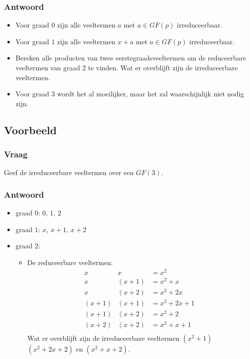 \documentclass[main.tex]{subfiles}
\begin{document}
\subsubsection*{Antwoord}
\begin{itemize}
\item Voor graad $0$ zijn alle veeltermen $a$ met $a\in GF(p)$ irreduceerbaar.
\item Voor graad $1$ zijn alle veeltermen $x+a$ met $a\in GF(p)$ irreduceerbaar.
\item Bereken alle producten van twee eerstegraadsveeltermen om de reduceerbare veeltermen van graad $2$ te vinden.
  Wat er overblijft zijn de irreduceerbare veeltermen.
\item Voor graad $3$ wordt het al moeilijker, maar het zal waarschijnlijk niet nodig zijn.
\end{itemize}

\subsection*{Voorbeeld}
\subsubsection*{Vraag}
Geef de irreduceerbare veeltermen over een $GF(3)$.
\subsubsection*{Antwoord}
\begin{itemize}
\item graad $0$: $0$, $1$, $2$
\item graad $1$: $x$, $x+1$, $x+2$
\item graad $2$:
  \begin{itemize}
  \item De reduceerbare veeltermen:
    \[
    \begin{array}{ccl}
      x & x &= x^{2}\\
      x & (x+1) &= x^{2} + x\\
      x & (x+2) &= x^{2} + 2x\\
      (x+1) & (x+1) &= x^{2} + 2x + 1\\
      (x+1) & (x+2) &= x^{2} + 2\\
      (x+2) & (x+2) &= x^{2} + x + 1\\
    \end{array}
    \]
    Wat er overblijft zijn de irreduceerbare veeltermen $(x^{2}+1)$ $(x^{2}+2x+2)$ en $(x^{2} +x + 2)$.
  \end{itemize}
\end{itemize}
\end{document}

